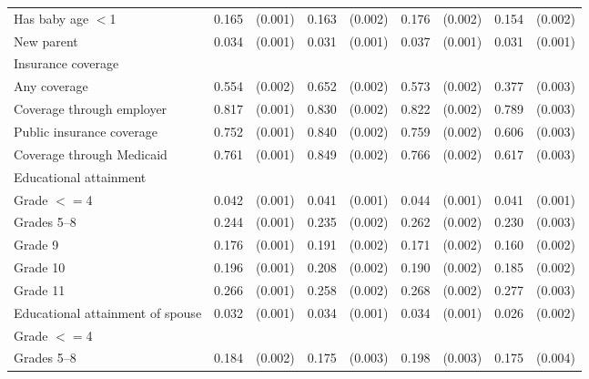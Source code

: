 \begin{tabular}{lcccccccc}
 Has baby age $<$1   & 0.165 & (0.001)  & 0.163 & (0.002)  & 0.176 & (0.002)  & 0.154 & (0.002)  \\
 New parent   & 0.034 & (0.001)  & 0.031 & (0.001)  & 0.037 & (0.001)  & 0.031 & (0.001)  \\
 Insurance coverage   & & & & & \\
 \hspace{0.3cm}  Any coverage   & 0.554 & (0.002)  & 0.652 & (0.002)  & 0.573 & (0.002)  & 0.377 & (0.003)  \\
 \hspace{0.3cm}  Coverage through employer   & 0.817 & (0.001)  & 0.830 & (0.002)  & 0.822 & (0.002)  & 0.789 & (0.003)  \\
 \hspace{0.3cm}  Public insurance coverage   & 0.752 & (0.001)  & 0.840 & (0.002)  & 0.759 & (0.002)  & 0.606 & (0.003)  \\
 \hspace{0.3cm}  Coverage through Medicaid   & 0.761 & (0.001)  & 0.849 & (0.002)  & 0.766 & (0.002)  & 0.617 & (0.003)  \\
 Educational attainment   & & & & & \\
 \hspace{0.3cm} Grade $<=$4   & 0.042 & (0.001)  & 0.041 & (0.001)  & 0.044 & (0.001)  & 0.041 & (0.001)  \\
 \hspace{0.3cm}  Grades 5--8   & 0.244 & (0.001)  & 0.235 & (0.002)  & 0.262 & (0.002)  & 0.230 & (0.003)  \\
 \hspace{0.3cm} Grade 9   & 0.176 & (0.001)  & 0.191 & (0.002)  & 0.171 & (0.002)  & 0.160 & (0.002)  \\
 \hspace{0.3cm} Grade 10   & 0.196 & (0.001)  & 0.208 & (0.002)  & 0.190 & (0.002)  & 0.185 & (0.002)  \\
 \hspace{0.3cm} Grade 11   & 0.266 & (0.001)  & 0.258 & (0.002)  & 0.268 & (0.002)  & 0.277 & (0.003)  \\
 Educational attainment of spouse   & 0.032 & (0.001)  & 0.034 & (0.001)  & 0.034 & (0.001)  & 0.026 & (0.002)  \\
 \hspace{0.3cm} Grade $<=$4   & & & & & \\
 \hspace{0.3cm}  Grades 5--8   & 0.184 & (0.002)  & 0.175 & (0.003)  & 0.198 & (0.003)  & 0.175 & (0.004)  \\

\end{tabular}
